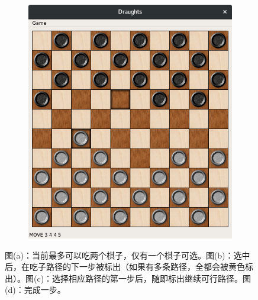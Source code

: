 \documentclass[11pt,a4paper]{article}
\begin{document}
\begin{figure}[H]
\begin{subfigure}{.24\textwidth}
		\caption{}
	\end{subfigure}
	\hfill
	\begin{subfigure}{.24\textwidth}
		\centering
		\includegraphics[width=\linewidth]{img10.png}
		\caption{}
	\end{subfigure}
	\caption{图(a)：当前最多可以吃两个棋子，仅有一个棋子可选。图(b)：选中后，在吃子路径的下一步被标出（如果有多条路径，全都会被黄色标出）。图(c)：选择相应路径的第一步后，随即标出继续可行路径。图(d)：完成一步。}
	\label{fig:2}
\end{figure}
\end{document}
